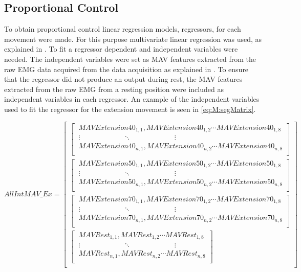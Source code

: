 \subsection{Proportional Control} \label{sub:M:regression}
To obtain proportional control linear regression models, regressors, for each movement were made. For this purpose multivariate linear regression was used, as explained in . To fit a regressor dependent and independent variables were needed. The independent variables were set as MAV features extracted from the raw EMG data acquired from the data acquisition as explained in . To ensure that the regressor did not produce an output during rest, the MAV features extracted from the raw EMG from a resting position were included as independent variables in each regressor. An example of the independent variables used to fit the regressor for the extension movement is seen in \eqref{eq:M:segMatrix}.
\begin{small}

\begin{equation} \label{eq:M:segMatrix}
AllIntMAV\_Ex=\begin{bmatrix}
\begin{bmatrix}
\ MAVExtension40_{1,1}, MAVExtension40_{1,2} \cdots MAVExtension40_{1,8} \\ 
\ \vdots \qquad \qquad \qquad \ddots \qquad \qquad \qquad \vdots \\
\ MAVExtension40_{n,1}, MAVExtension40_{n,2}  \cdots MAVExtension40_{n,8} \\ \end{bmatrix} \\
\begin{bmatrix} 
\ MAVExtension50_{1,1}, MAVExtension50_{1,2} \cdots MAVExtension50_{1,8} \\
\ \vdots \qquad \qquad \qquad \ddots \qquad \qquad \qquad \vdots \\
\ MAVExtension50_{n,1}, MAVExtension50_{n,2} \cdots MAVExtension50_{n,8} \\ \end{bmatrix} \\
\begin{bmatrix} 
\ MAVExtension70_{1,1}, MAVExtension70_{1,2} \cdots MAVExtension70_{1,8} \\
\ \vdots \qquad \qquad \qquad \ddots \qquad \qquad \qquad \vdots \\
\ MAVExtension70_{n,1}, MAVExtension70_{n,2} \cdots MAVExtension70_{n,8} \\ \end{bmatrix} \\
\begin{bmatrix}
\ MAVRest_{1,1}, MAVRest_{1,2} \cdots MAVRest_{1,8} \\ 
\ \vdots \qquad \qquad \qquad \ddots \qquad \qquad \qquad \vdots \\
\ MAVRest_{n,1}, MAVRest_{n,2}  \cdots MAVRest_{n,8} \\ \end{bmatrix} \\
\end{bmatrix}
\end{equation}
\end{small}

